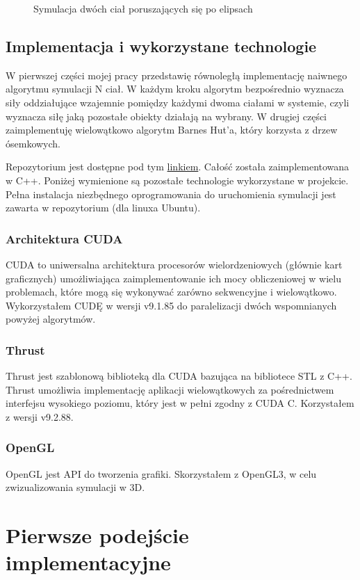 \documentclass[14pt,twoside,a4paper]{article}
\begin{document}
\begin{figure}
    \centering
    \def\svgwidth{\columnwidth}
    
    \caption{Symulacja dwóch ciał poruszających się po elipsach}
\end{figure}


\subsection{\Large Implementacja i wykorzystane technologie}
W pierwszej części mojej pracy przedstawię równoległą implementację naiwnego algorytmu symulacji N ciał. W każdym kroku algorytm bezpośrednio wyznacza siły oddziałujące wzajemnie pomiędzy każdymi dwoma ciałami w systemie, czyli wyznacza siłę jaką pozostałe obiekty działają na wybrany. W drugiej części zaimplementuję wielowątkowo algorytm Barnes Hut'a, który korzysta z drzew ósemkowych.

Repozytorium jest dostępne pod tym \href{https://github.com/damian1996/N-Body-Simulation}{linkiem}.
Całość została zaimplementowana w C++. Poniżej wymienione są pozostałe technologie wykorzystane w projekcie. \\
Pełna instalacja niezbędnego oprogramowania do uruchomienia symulacji jest zawarta w repozytorium (dla linuxa Ubuntu).
\subsubsection{\large Architektura CUDA}
CUDA to uniwersalna architektura procesorów wielordzeniowych (głównie kart graficznych) umożliwiająca zaimplementowanie ich mocy obliczeniowej w wielu problemach, które mogą się wykonywać zarówno sekwencyjne i wielowątkowo. Wykorzystałem CUDĘ w wersji v9.1.85 do paralelizacji dwóch wspomnianych powyżej algorytmów.
\subsubsection{\large Thrust}
Thrust jest szablonową biblioteką dla CUDA bazująca na bibliotece STL z C++. Thrust umożliwia implementację aplikacji wielowątkowych za pośrednictwem interfejsu wysokiego poziomu, który jest w pełni zgodny z CUDA C. Korzystałem z wersji v9.2.88. 
\subsubsection{\large OpenGL}
OpenGL jest API do tworzenia grafiki. Skorzystałem z OpenGL3, w celu zwizualizowania symulacji w 3D.


\section{\LARGE Pierwsze podejście implementacyjne}
\bigskip
\end{document}
